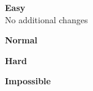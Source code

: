 \begin{multicols}{4}
  \centering
   \textbf{Easy}\\
  \vspace{2em}
  No additional changes

  \columnbreak

   \textbf{Normal}

  \columnbreak

   \textbf{Hard}

  \columnbreak

   \textbf{Impossible}
\end{multicols}

